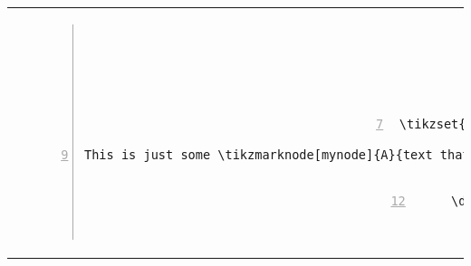 \begin{tabular}{c | c}
\begin{minipage}[m]{0.4\textwidth}
\enum{\tikzset{mynode/.style={inner sep=2pt,fill=cyan!50,draw=blue,line width=1pt,rounded corners}}

\tikzmarknode[mynode]{A}{This} is just some text that I will repeat for this section again and again. This is just some text that I will repeat for this section again and again. 

\begin{tikzpicture}[remember picture, overlay]
    \draw[->,line width=1pt,blue] (A) --++ (1,1) node[above right] {your comment here};
\end{tikzpicture}}{\thesubsection}
\end{minipage}
&
\begin{minipage}[m]{0.55\textwidth}
\renewcommand\textminus{\mbox{-}}%
\begin{lstlisting}[numberstyle=\zebra{green!15}{yellow!15},numbers=left,basicstyle=\ttfamily\scriptsize]{tex}
\documentclass{article}
\usepackage{tikz}
\usetikzlibrary{tikzmark}


\tikzset{mynode/.style={inner sep=2pt,fill=cyan!50,draw=blue,line width=1pt,rounded corners}}

This is just some \tikzmarknode[mynode]{A}{text that} I will repeat for this section again and again. This is just some text that I will repeat for this section again and again. 

\begin{tikzpicture}[remember picture, overlay]
    \draw[->,line width=1pt,blue] (A) --++ (1,1) node[above right] {your comment here};
\end{tikzpicture}


\end{lstlisting}
\end{minipage}
\end{tabular}
 

\subsection{}
 
